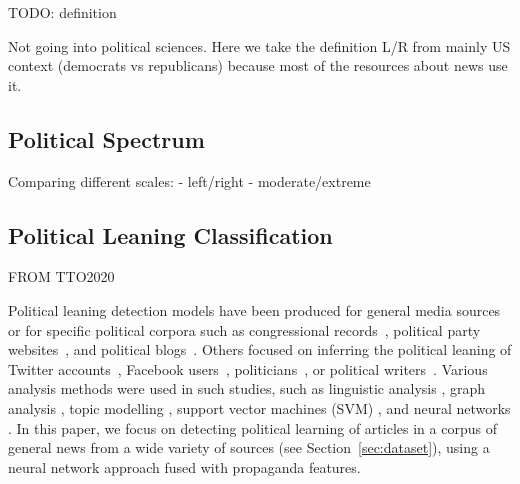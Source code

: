 TODO: definition

Not going into political sciences. Here we take the definition L/R from mainly US context (democrats vs republicans) because most of the resources about news use it.

\subsection{Political Spectrum}

Comparing different scales:
- left/right
- moderate/extreme

\subsection{Political Leaning Classification}
\label{ssec:lit_leaning_classification}

FROM TTO2020



Political leaning detection models have been produced for general media sources~\cite{budak} or for 
specific political corpora such as congressional records~\cite{gentzkow}, political party websites~\cite{yan2017perils}, and political blogs~\cite{ahmed201}.  
Others focused on inferring the political leaning of Twitter accounts~\cite{Cohen2013ClassifyingPO}, Facebook users~\cite{Bakshy1130}, politicians~\cite{thomas-etal-2006-get}, or political writers~\cite{iyyer-etal-2014-political}. 
Various analysis methods were used in such studies, such as linguistic analysis \cite{gentzkow}, graph analysis \cite{chen2017opinion}, topic modelling \cite{ahmed201, Cohen2013ClassifyingPO}, support vector machines (SVM) \cite{Bakshy1130,thomas-etal-2006-get}, and neural networks \cite{iyyer-etal-2014-political,baly2020we}. In this paper, we focus on detecting political learning of articles in a corpus of general news from a wide variety of sources (see Section~\ref{sec:dataset}), using a neural network approach fused with propaganda features. %


